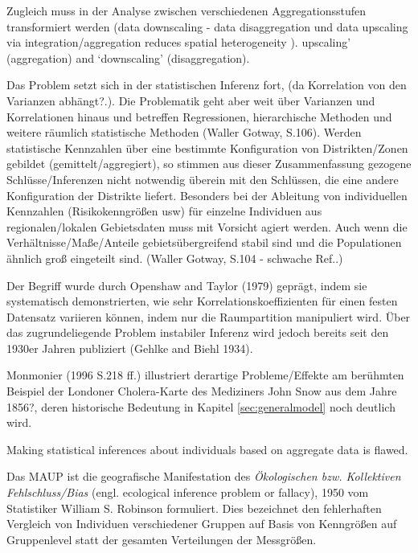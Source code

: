Zugleich muss in der Analyse zwischen verschiedenen Aggregationsstufen transformiert werden 
(data downscaling - data disaggregation und data upscaling via integration/aggregation reduces spatial heterogeneity ).
upscaling’ (aggregation) and ‘downscaling’ (disaggregation).

Das Problem setzt sich in der statistischen Inferenz fort, (da Korrelation von den Varianzen abhängt?.). 
Die Problematik geht aber weit über Varianzen und Korrelationen hinaus und betreffen Regressionen, hierarchische Methoden und weitere räumlich statistische Methoden (Waller Gotway, S.106).
Werden statistische Kennzahlen über eine bestimmte Konfiguration von Distrikten/Zonen gebildet (gemittelt/aggregiert), 
so stimmen aus dieser Zusammenfassung gezogene Schlüsse/Inferenzen nicht notwendig überein mit den Schlüssen, die eine andere Konfiguration der Distrikte liefert.
Besonders bei der Ableitung von individuellen Kennzahlen (Risikokenngrößen usw) für einzelne Individuen aus regionalen/lokalen Gebietsdaten muss mit Vorsicht agiert werden. 
Auch wenn die Verhältnisse/Maße/Anteile gebietsübergreifend stabil sind und die Populationen ähnlich groß eingeteilt sind. (Waller Gotway, S.104 - schwache Ref..)

Der Begriff wurde durch Openshaw and Taylor (1979) geprägt, indem sie systematisch demonstrierten, 
wie sehr Korrelationskoeffizienten für einen festen Datensatz variieren können, indem nur die Raumpartition manipuliert wird.
Über das zugrundeliegende Problem instabiler Inferenz wird jedoch bereits seit den 1930er Jahren publiziert (Gehlke and Biehl 1934).

Monmonier (1996 S.218 ff.) illustriert derartige Probleme/Effekte am berühmten Beispiel der Londoner Cholera-Karte des Mediziners John Snow aus dem Jahre 1856?, deren
historische Bedeutung in Kapitel \ref{sec:generalmodel} noch deutlich wird.

Making statistical inferences about individuals based on aggregate data is flawed.

Das MAUP ist die geografische Manifestation des \emph{Ökologischen bzw. Kollektiven Fehlschluss/Bias} (engl. ecological inference problem or fallacy), 
1950 vom Statistiker William S. Robinson formuliert. 
Dies bezeichnet den fehlerhaften Vergleich von Individuen verschiedener Gruppen auf Basis von Kenngrößen auf Gruppenlevel statt der gesamten Verteilungen der Messgrößen.

